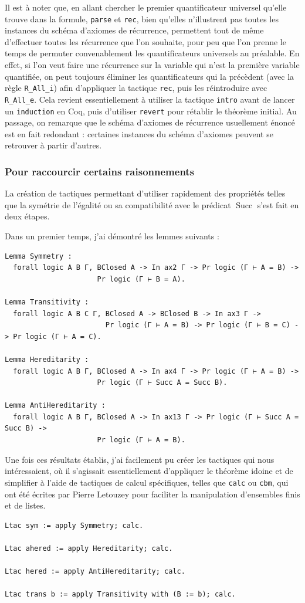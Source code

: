 \documentclass[a4paper]{article}
\DeclareMathOperator{\Succ}{\mathrm{Succ}}
\theoremstyle{remark}
\theoremstyle{remark}
\theoremstyle{remark}
\theoremstyle{definition}
\theoremstyle{definition}
\theoremstyle{definition}
\begin{document}
Il est à noter que, en allant chercher le premier quantificateur universel qu'elle trouve dans la formule, \verb+parse+ et \verb+rec+, bien qu'elles n'illustrent pas toutes les instances du schéma d'axiomes de récurrence, permettent tout de même d'effectuer toutes les récurrence que l'on souhaite, pour peu que l'on prenne le temps de permuter convenablement les quantificateurs universels au préalable. En effet, si l'on veut faire une récurrence sur la variable qui n'est la première variable quantifiée, on peut toujours éliminer les quantificateurs qui la précèdent (avec la règle \verb+R_All_i+) afin d'appliquer la tactique \verb+rec+, puis les réintroduire avec \verb+R_All_e+. Cela revient essentiellement à utiliser la tactique \verb+intro+ avant de lancer un \verb+induction+ en Coq, puis d'utiliser \verb+revert+ pour rétablir le théorème initial. Au passage, on remarque que le schéma d'axiomes de récurrence usuellement énoncé est en fait redondant : certaines instances du schéma d'axiomes peuvent se retrouver à partir d'autres.

\subsubsection{Pour raccourcir certains raisonnements}

La création de tactiques permettant d'utiliser rapidement des propriétés telles que la symétrie de l'égalité ou sa compatibilité avec le prédicat $\Succ$ s'est fait en deux étapes.

Dans un premier temps, j'ai démontré les lemmes suivants :
\begin{verbatim}
Lemma Symmetry :
  forall logic A B Γ, BClosed A -> In ax2 Γ -> Pr logic (Γ ⊢ A = B) ->
                      Pr logic (Γ ⊢ B = A).

Lemma Transitivity :
  forall logic A B C Γ, BClosed A -> BClosed B -> In ax3 Γ ->
                        Pr logic (Γ ⊢ A = B) -> Pr logic (Γ ⊢ B = C) -> Pr logic (Γ ⊢ A = C).

Lemma Hereditarity :
  forall logic A B Γ, BClosed A -> In ax4 Γ -> Pr logic (Γ ⊢ A = B) ->
                      Pr logic (Γ ⊢ Succ A = Succ B).

Lemma AntiHereditarity :
  forall logic A B Γ, BClosed A -> In ax13 Γ -> Pr logic (Γ ⊢ Succ A = Succ B) ->
                      Pr logic (Γ ⊢ A = B).
\end{verbatim}

Une fois ces résultats établis, j'ai facilement pu créer les tactiques qui nous intéressaient, où il s'agissait essentiellement d'appliquer le théorème idoine et de simplifier à l'aide de tactiques de calcul spécifiques, telles que \verb+calc+ ou \verb+cbm+, qui ont été écrites par Pierre Letouzey pour faciliter la manipulation d'ensembles finis et de listes.
\begin{verbatim}
Ltac sym := apply Symmetry; calc.

Ltac ahered := apply Hereditarity; calc.

Ltac hered := apply AntiHereditarity; calc.

Ltac trans b := apply Transitivity with (B := b); calc.
\end{verbatim}
\smallskip
\end{document}
